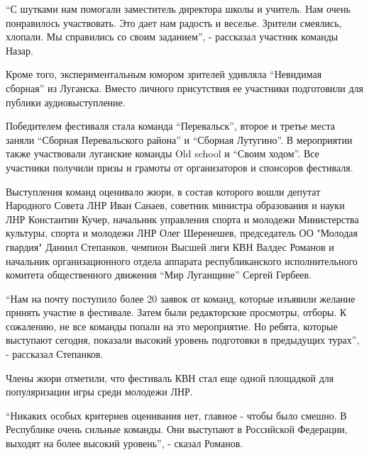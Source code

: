 
\enquote{С шутками нам помогали заместитель директора школы и учитель. Нам очень
понравилось участвовать. Это дает нам радость и веселье. Зрители смеялись,
хлопали. Мы справились со своим заданием}, - рассказал участник команды Назар.


Кроме того, экспериментальным юмором зрителей удивляла \enquote{Невидимая сборная} из
Луганска. Вместо личного присутствия ее участники подготовили для публики
аудиовыступление.


Победителем фестиваля стала команда \enquote{Перевальск}, второе и третье места заняли
\enquote{Сборная Перевальского района} и \enquote{Сборная Лутугино}. В мероприятии также
участвовали луганские команды Old school и \enquote{Своим ходом}. Все участники
получили призы и грамоты от организаторов и спонсоров фестиваля.

Выступления команд оценивало жюри, в состав которого вошли депутат Народного
Совета ЛНР Иван Санаев, советник министра образования и науки ЛНР Константин
Кучер, начальник управления спорта и молодежи Министерства культуры, спорта и
молодежи ЛНР Олег Шеренешев, председатель ОО "Молодая гвардия" Даниил
Степанков, чемпион Высшей лиги КВН Валдес Романов и начальник организационного
отдела аппарата республиканского исполнительного комитета общественного
движения \enquote{Мир Луганщине} Сергей Гербеев.

\enquote{Нам на почту поступило более 20 заявок от команд, которые изъявили желание
принять участие в фестивале. Затем были редакторские просмотры, отборы. К
сожалению, не все команды попали на это мероприятие. Но ребята, которые
выступают сегодня, показали высокий уровень подготовки в предыдущих турах}, -
рассказал Степанков.

Члены жюри отметили, что фестиваль КВН стал еще одной площадкой для
популяризации игры среди молодежи ЛНР.

\enquote{Никаких особых критериев оценивания нет, главное - чтобы было смешно. В
Республике очень сильные команды. Они выступают в Российской Федерации, выходят
на более высокий уровень}, - сказал Романов.
